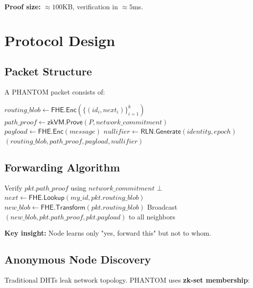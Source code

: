\documentclass[11pt]{article}
\begin{document}
\textbf{Proof size:} $\approx 100$KB, verification in $\approx 5$ms.

\section{Protocol Design}

\subsection{Packet Structure}

A PHANTOM packet consists of:

\begin{algorithm}
\caption{PHANTOM Packet Format}
\begin{algorithmic}[1]
\State $routing\_blob \gets \mathsf{FHE.Enc}(\{(id_i, next_i)\}_{i=1}^{k})$
\State $path\_proof \gets \mathsf{zkVM.Prove}(P, network\_commitment)$
\State $payload \gets \mathsf{FHE.Enc}(message)$
\State $nullifier \gets \mathsf{RLN.Generate}(identity, epoch)$
\State \Return $(routing\_blob, path\_proof, payload, nullifier)$
\end{algorithmic}
\end{algorithm}

\subsection{Forwarding Algorithm}

\begin{algorithm}
\caption{Oblivious Packet Forwarding}
\begin{algorithmic}[1]
    \State Verify $pkt.path\_proof$ using $network\_commitment$
     \Return $\bot$
    \EndIf
    \State $next \gets \mathsf{FHE.Lookup}(my\_id, pkt.routing\_blob)$
    \State $new\_blob \gets \mathsf{FHE.Transform}(pkt.routing\_blob)$
    \State Broadcast $(new\_blob, pkt.path\_proof, pkt.payload)$ to all neighbors
\EndProcedure
\end{algorithmic}
\end{algorithm}

\textbf{Key insight:} Node learns only "yes, forward this" but not to whom.

\subsection{Anonymous Node Discovery}

Traditional DHTs leak network topology. PHANTOM uses \textbf{zk-set membership}:
\end{document}

